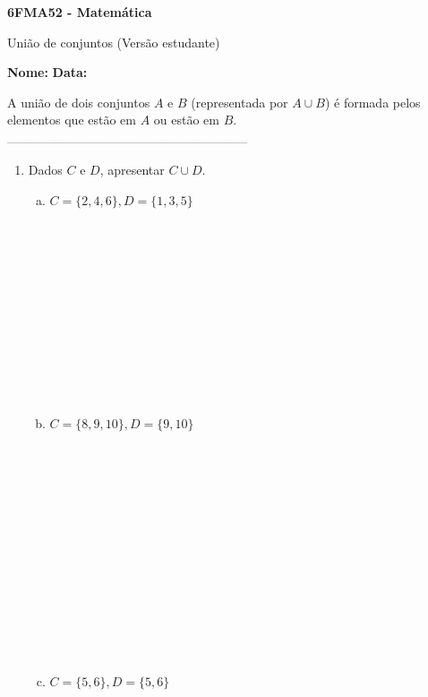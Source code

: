 \documentclass[a4paper,14pt]{article}
\begin{document}
	
	\noindent\textbf{6FMA52 - Matemática} 
	
	\begin{center}União de conjuntos (Versão estudante)
	\end{center}
	
	\noindent\textbf{Nome:} \underline{\hspace{10cm}}
	\noindent\textbf{Data:} \underline{\hspace{4cm}}
	
	\begin{multicols}{2}
    		\noindent A união de dois conjuntos $A$ e $B$ (representada por $A \cup B$) é formada pelos elementos que estão em $A$ ou estão em $B$.
    		\textsubscript{---------------------------------------------------------------------}
    		\begin{enumerate}
    			\item Dados $C$ e $D$, apresentar $C \cup D$.
    			\begin{enumerate}[a)]
    				\item $C = \{2, 4, 6\}, D = \{1, 3, 5\}$ \\\\\\\\\\\\\\\\\\\\\\\\
    				\item $C = \{8, 9, 10\}, D = \{9, 10\}$ \\\\\\\\\\\\\\\\\\\\\\\\\\\\
    				\item $C = \{5, 6\}, D = \{5, 6\}$ \\\\\\\\\\\\\\\\\\\\

\end{enumerate}
\end{enumerate}
\end{multicols}
\end{document}
